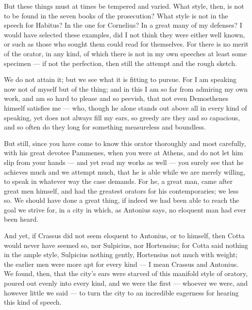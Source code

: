  But these things must at times be tempered and varied. What style, then, is not to be found in the seven books of the prosecution? What style is not in the speech for Habitus? In the one for Cornelius? In a great many of my defenses? I would have selected these examples, did I not think they were either well known, or such as those who sought them could read for themselves. For there is no merit of the orator, in any kind, of which there is not in my own speeches at least some specimen — if not the perfection, then still the attempt and the rough sketch.

 We do not attain it; but we see what it is fitting to pursue. For I am speaking now not of myself but of the thing; and in this I am so far from admiring my own work, and am so hard to please and so peevish, that not even Demosthenes himself satisfies me — who, though he alone stands out above all in every kind of speaking, yet does not always fill my ears, so greedy are they and so capacious, and so often do they long for something measureless and boundless.

 But still, since you have come to know this orator thoroughly and most carefully, with his great devotee Pammenes, when you were at Athens, and do not let him slip from your hands — and yet read my works as well — you surely see that he achieves much and we attempt much, that he is able while we are merely willing, to speak in whatever way the case demands. For he, a great man, came after great men himself, and had the greatest orators for his contemporaries; we less so. We should have done a great thing, if indeed we had been able to reach the goal we strive for, in a city in which, as Antonius says, no eloquent man had ever been heard.

 And yet, if Crassus did not seem eloquent to Antonius, or to himself, then Cotta would never have seemed so, nor Sulpicius, nor Hortensius; for Cotta said nothing in the ample style, Sulpicius nothing gently, Hortensius not much with weight; the earlier men were more apt for every kind — I mean Crassus and Antonius. We found, then, that the city's ears were starved of this manifold style of oratory, poured out evenly into every kind, and we were the first — whoever we were, and however little we said — to turn the city to an incredible eagerness for hearing this kind of speech.

